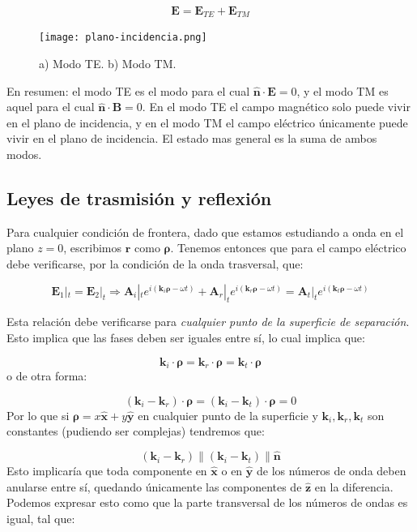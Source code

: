\documentclass[12pt,a4paper]{article}
\newcommand{\Bn}{\mathbf{B}}
\newcommand{\En}{\mathbf{E}}
\newcommand{\kn}{\mathbf{k}}
\newcommand{\rn}{\mathbf{r}}
\newcommand{\An}{\mathbf{A}}
\newcommand{\hnn}{\hat{\mathbf{n}}}
\newcommand{\hnz}{\hat{\mathbf{z}}}
\newcommand{\hnx}{\hat{\mathbf{x}}}
\newcommand{\hny}{\hat{\mathbf{y}}}
\newcommand{\nrho}{\boldsymbol{\rho}}
\numberwithin{equation}{section}
\numberwithin{figure}{section}
\begin{document}
\begin{equation}
\En = \En_{TE} + \En_{TM}
\end{equation}

\begin{figure}[h!] \centering
\texttt{[image: plano-incidencia.png]}
\caption{a) Modo TE. b) Modo TM.}
\end{figure}

En resumen: el modo TE es el modo para el cual $\hnn \cdot \En = 0$, y el modo TM es aquel para el cual $\hnn \cdot \Bn = 0$. En el modo TE el campo magnético solo puede vivir en el plano de incidencia, y en el modo TM el campo eléctrico únicamente puede vivir en el plano de incidencia. El estado mas general es la suma de ambos modos.

\subsection{Leyes de trasmisión y reflexión}

Para cualquier condición de frontera, dado que estamos estudiando a onda en el plano $z=0$, escribimos $\rn$ como $\nrho$. Tenemos entonces que para el campo eléctrico debe verificarse, por la condición de la onda trasversal, que:

\begin{equation} 
\En_1 |_t = \En_2 |_t \Longrightarrow \An_i |_t e^{i(\kn_i \nrho - \omega t)} + \An_r |_t e^{i(\kn_r \nrho - \omega t)} = \An_t |_t e^{i(\kn_t \nrho - \omega t)}
\end{equation}

Esta relación debe verificarse para \textit{cualquier punto de la superficie de separación}. Esto implica que las fases deben ser iguales entre sí, lo cual implica que:

\begin{equation}
\kn_i \cdot \nrho = 
\kn_r \cdot \nrho = 
\kn_t \cdot \nrho 
\end{equation}
o de otra forma:

\begin{equation}
(\kn_i - \kn_r) \cdot \nrho = 
(\kn_i - \kn_t) \cdot \nrho = 0
\end{equation}
Por lo que si $\nrho=x\hnx+ y \hny $ en cualquier punto de la superficie y $\kn_i,\kn_r,\kn_t$ son constantes (pudiendo ser complejas) tendremos que:

\begin{equation}
(\kn_i - \kn_r) \parallel (\kn_i - \kn_t) \parallel \hnn 
\end{equation}
Esto implicaría que toda componente en $\hnx$ o en $\hny$ de los números de onda deben anularse entre sí, quedando únicamente las componentes de $\hnz$ en la diferencia. Podemos expresar esto como que la parte transversal de los números de ondas es igual, tal que:
\end{document}
